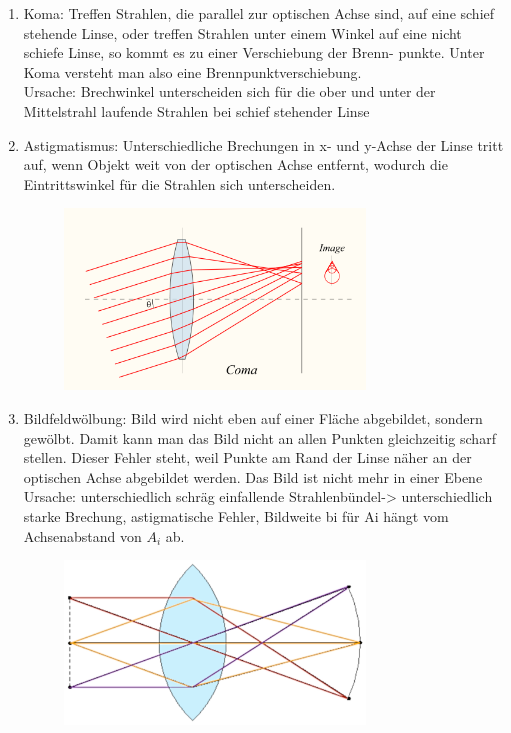 \documentclass[a4paper, 11pt, ngerman, parskip=half-]{scrartcl}
\begin{document}
\begin{enumerate}
    \item Koma: Treffen Strahlen, die parallel zur optischen Achse sind, auf eine schief stehende Linse, oder treffen Strahlen unter einem Winkel auf eine nicht schiefe Linse, so kommt es zu einer Verschiebung der Brenn- punkte. Unter Koma versteht man also eine Brennpunktverschiebung.\\


          Ursache: Brechwinkel unterscheiden sich für die ober und unter der Mittelstrahl laufende Strahlen bei schief stehender Linse

    \item Astigmatismus: Unterschiedliche Brechungen in x- und y-Achse der Linse tritt auf, wenn Objekt weit von der optischen Achse entfernt, wodurch die Eintrittswinkel für die Strahlen sich unterscheiden.

          \begin{figure}[H]
              \centering
              \includegraphics[width=8cm]{image/18/geo2koma}
          \end{figure}


    \item Bildfeldwölbung: Bild wird nicht eben auf einer Fläche abgebildet, sondern gewölbt. Damit kann man das Bild nicht an allen Punkten gleichzeitig scharf stellen. Dieser Fehler steht, weil Punkte am Rand der Linse näher an der optischen Achse abgebildet werden. Das Bild ist nicht mehr in einer Ebene\\

          Ursache: unterschiedlich schräg einfallende Strahlenbündel-> unterschiedlich starke Brechung, astigmatische Fehler, Bildweite bi für Ai hängt vom Achsenabstand von $A_i$ ab.

          \begin{figure}[H]
              \centering
              \includegraphics[width=8cm]{image/18/geo2bildfeld}
          \end{figure}


\end{enumerate}
\end{document}
